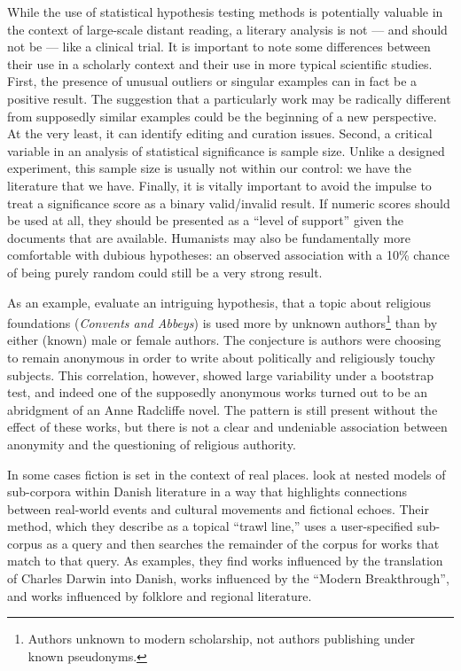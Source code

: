 While the use of statistical hypothesis testing methods is potentially valuable in the context of large-scale distant reading, a literary analysis is not --- and should not be --- like a clinical trial.
It is important to note some differences between their use in a scholarly context and their use in more typical scientific studies.
First, the presence of unusual outliers or singular examples can in fact be a positive result.
The suggestion that a particularly work may be radically different from supposedly similar examples could be the beginning of a new perspective.
At the very least, it can identify editing and curation issues.
Second, a critical variable in an analysis of statistical significance is sample size.
Unlike a designed experiment, this sample size is usually not within our control: we have the literature that we have.
Finally, it is vitally important to avoid the impulse to treat a significance score as a binary valid/invalid result.
If numeric scores should be used at all, they should be presented as a ``level of support'' given the documents that are available.
Humanists may also be fundamentally more comfortable with dubious hypotheses: an observed association with a 10\% chance of being purely random could still be a very strong result.

As an example, \cite{jockers-13b} evaluate an intriguing hypothesis, that a topic about religious foundations ({\em Convents and Abbeys}) is used more by unknown authors\footnote{Authors unknown to modern scholarship, not authors publishing under known pseudonyms.} than by either (known) male or female authors.
The conjecture is authors were choosing to remain anonymous in order to write about politically and religiously touchy subjects.
This correlation, however, showed large variability under a bootstrap test, and indeed one of the supposedly anonymous works turned out to be an abridgment of an Anne Radcliffe novel.
The pattern is still present without the effect of these works, but there is not a clear and undeniable association between anonymity and the questioning of religious authority.

In some cases fiction is set in the context of real places.
\cite{tangherlini-13} look at nested models of sub-corpora within Danish literature in a way that highlights connections between real-world events and cultural movements and fictional echoes.
Their method, which they describe as a topical ``trawl line,'' uses a user-specified sub-corpus as a query and then searches the remainder of the corpus for works that match to that query.
As examples, they find works influenced by the translation of Charles Darwin into Danish, works influenced by the ``Modern Breakthrough'', and works influenced by folklore and regional literature.


